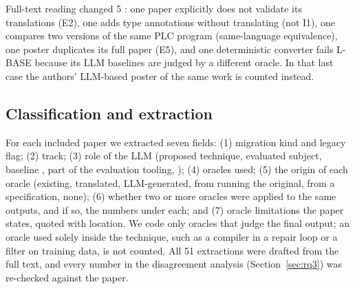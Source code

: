  Full-text reading changed 5 : one paper explicitly does not validate its translations (E2), one adds type annotations without translating (not I1), one compares two versions of the same PLC program (same-language equivalence), one poster duplicates its full paper (E5), and one deterministic converter fails L-BASE because its LLM baselines are judged by a different oracle. In that last case the authors' LLM-based poster of the same work is counted instead. 

\subsection{Classification and extraction}
\label{sec:extraction}

For each included paper we extracted seven fields: (1) migration kind and legacy flag; (2) track; (3) role of the LLM (proposed technique, evaluated subject,  baseline , part of the evaluation tooling, ); (4) oracles used; (5) the origin of each oracle (existing, translated, LLM-generated, from running the original, from a specification, none); (6) whether two or more oracles were applied to the same outputs, and if so, the numbers under each; and (7) oracle limitations the paper states, quoted with location. We code only oracles that judge the final output; an oracle used solely inside the technique, such as a compiler in a repair loop or a filter on training data, is not counted. All 51 extractions were drafted from the full text, and every number in the disagreement analysis (Section~\ref{sec:rq3}) was re-checked against the paper. 


